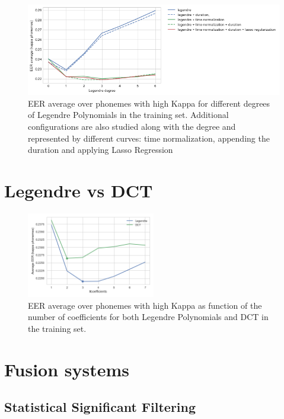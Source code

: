 \begin{figure}[H]
	\centering
	\includegraphics[width=1.0\textwidth]{files/figures/results/legendre-dct/legendre-tunning.png}
	\caption{EER average over phonemes with high Kappa for different 
	degrees of Legendre Polynomials in
	the training set. Additional configurations are also studied along with the degree and 
	represented by different curves: time normalization, appending the duration and applying
	Lasso Regression}
	\label{fig:legendreTunning}
\end{figure}


\section{Legendre vs DCT}

\begin{figure}[H]
	\centering
	\includegraphics[width=0.5\textwidth]{files/figures/results/legendre-dct/legendre-dct-coefficients.png}
	\caption{EER average over phonemes with high Kappa as function of the number of coefficients
	for both Legendre Polynomials and DCT in the training set.}
	\label{fig:legendreVsDCT}
\end{figure}


\section{Fusion systems}

\subsection{Statistical Significant Filtering}

